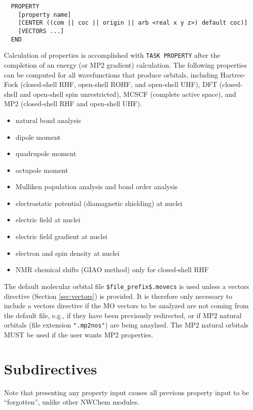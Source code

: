 %
%
\label{sec:property}
\begin{verbatim}
  PROPERTY
    [property name]
    [CENTER ((com || coc || origin || arb <real x y z>) default coc)]
    [VECTORS ...]
  END
\end{verbatim}

Calculation of properties is accomplished with \verb+TASK PROPERTY+
after the completion of an energy (or MP2 gradient) calculation.  The
following properties can be computed for all wavefunctions that produce
orbitals, including Hartree-Fock (closed-shell RHF, open-shell ROHF, and
open-shell UHF), DFT (closed-shell and open-shell spin unrestricted),
MCSCF (complete active space), and MP2 (closed-shell RHF and open-shell
UHF).

\begin{itemize}
\item natural bond analysis
\item dipole moment
\item quadrupole moment
\item octupole moment
\item Mulliken population analysis and bond order analysis
\item electrostatic potential (diamagnetic shielding) at nuclei 
\item electric field at nuclei 
\item electric field gradient at nuclei 
\item electron and spin density at nuclei 
\item NMR chemical shifts (GIAO method) only for closed-shell RHF
\end{itemize}

The default molecular orbital file \verb+$file_prefix$.movecs+ is used
unless a vectors directive (Section \ref{sec:vectors}) is provided.  It is
therefore only necessary to include a vectors directive if the MO vectors
to be analyzed are not coming from the default file, e.g., if they have
been previously redirected, or if MP2 natural orbitals (file extension
\verb+".mp2nos"+) are being anaylzed.  The MP2 natural orbitals MUST be
used if the user wants MP2 properties.

\section{Subdirectives}

Note that presenting any property input causes all previous property input
to be ``forgotten'', unlike other NWChem modules.

